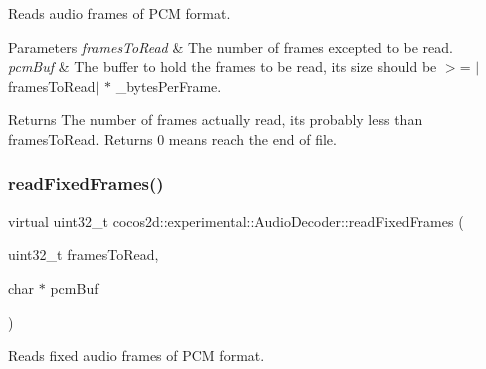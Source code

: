 Reads audio frames of P\+CM format. 


\begin{DoxyParams}{Parameters}
{\em frames\+To\+Read} & The number of frames excepted to be read. \\
\hline
{\em pcm\+Buf} & The buffer to hold the frames to be read, its size should be $>$= $\vert$frames\+To\+Read$\vert$ $\ast$ \+\_\+bytes\+Per\+Frame. \\
\hline
\end{DoxyParams}
\begin{DoxyReturn}{Returns}
The number of frames actually read, it\textquotesingle{}s probably less than \textquotesingle{}frames\+To\+Read\textquotesingle{}. Returns 0 means reach the end of file. 
\end{DoxyReturn}
\mbox{\label{classcocos2d_1_1experimental_1_1AudioDecoder_aa4f78c77e07a069be14148ce2d78d333}} 
\subsubsection{\texorpdfstring{read\+Fixed\+Frames()}{readFixedFrames()}\hspace{0.1cm}{\footnotesize\ttfamily [1/2]}}
{\footnotesize\ttfamily virtual uint32\+\_\+t cocos2d\+::experimental\+::\+Audio\+Decoder\+::read\+Fixed\+Frames (\begin{DoxyParamCaption}\item[{uint32\+\_\+t}]{frames\+To\+Read,  }\item[{char $\ast$}]{pcm\+Buf }\end{DoxyParamCaption})\hspace{0.3cm}{\ttfamily [virtual]}}



Reads fixed audio frames of P\+CM format. 


